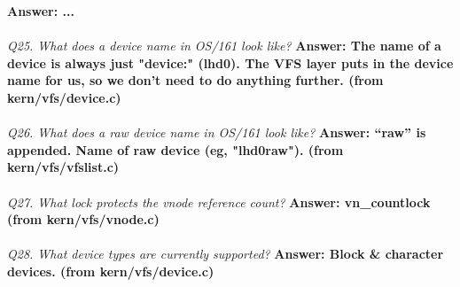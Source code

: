 \documentclass[11pt, english]{article}
\begin{document}
	\textbf{Answer: ...}\\ \\ 
	\textit{Q25. What does a device name in OS/161 look like?}\newline 
	\textbf{Answer: The name of a device is always just "device:" (lhd0). The VFS layer puts in the device name for us, so we don't need to do anything further. (from kern/vfs/device.c)}\\ \\ 
	\textit{Q26. What does a raw device name in OS/161 look like?}\newline %
	\textbf{Answer: “raw” is appended. Name of raw device (eg, "lhd0raw").  (from kern/vfs/vfslist.c)}\\ \\ 
	\textit{Q27. What lock protects the vnode reference count?}\newline 
	\textbf{Answer: vn\_countlock (from kern/vfs/vnode.c)}\\ \\ 
	\textit{Q28. What device types are currently supported?}\newline 
	\textbf{Answer: Block \& character devices. (from kern/vfs/device.c)}\\ \\ 
	
	
\end{document}
